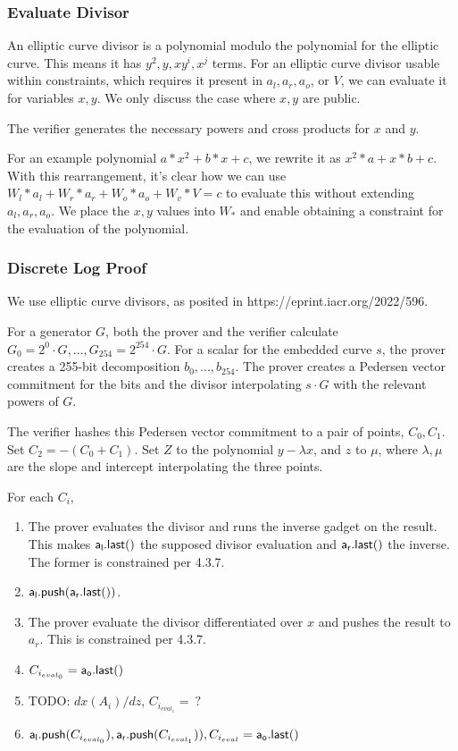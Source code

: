 \documentclass[]{article}
\begin{document}
\subsubsection{Evaluate Divisor}

An elliptic curve divisor is a polynomial modulo the polynomial for the elliptic curve. This means it has $y^2, y, xy^i, x^j$ terms. For an elliptic curve divisor usable within constraints, which requires it present in $a_l, a_r, a_o$, or $V$, we can evaluate it for variables $x, y$. We only discuss the case where $x, y$ are public.

The verifier generates the necessary powers and cross products for $x$ and $y$.

For an example polynomial $a * x^2 + b * x + c$, we rewrite it as $x^2 * a + x * b + c$. With this rearrangement, it's clear how we can use $W_l * a_l + W_r * a_r + W_o * a_o + W_v * V = c$ to evaluate this without extending $a_l, a_r, a_o$. We place the $x, y$ values into $W_*$ and enable obtaining a constraint for the evaluation of the polynomial.

\subsubsection{Discrete Log Proof}

We use elliptic curve divisors, as posited in https://eprint.iacr.org/2022/596.

For a generator $G$, both the prover and the verifier calculate $G_0 = 2^0 \cdot G, ...,G_{254} = 2^{254} \cdot G$. For a scalar for the embedded curve $s$, the prover creates a 255-bit decomposition $b_0, ..., b_{254}$. The prover creates a Pedersen vector commitment for the bits and the divisor interpolating $s \cdot G$ with the relevant powers of $G$.

The verifier hashes this Pedersen vector commitment to a pair of points, $C_0, C_1$. Set $C_2 = -(C_0 + C_1)$. Set $Z$ to the polynomial $y - \lambda x$, and $z$ to $\mu$, where $\lambda, \mu$ are the slope and intercept interpolating the three points.

For each $C_i$,

\begin{enumerate}
	\item The prover evaluates the divisor and runs the inverse gadget on the result. This makes $\mathsf{a_l.last()}$ the supposed divisor evaluation and $\mathsf{a_r.last()}$ the inverse. The former is constrained per 4.3.7.
	\item $\mathsf{a_l.push}(\mathsf{a_r.last()})$.
	\item The prover evaluate the divisor differentiated over $x$ and pushes the result to $a_r$. This is constrained per 4.3.7.
	\item $C_{i_{eval_0}} = \mathsf{a_o.last()}$
	\item TODO: $dx(A_i) / dz$, $C_{i_{eval_1}} = ~?$
	\item $\mathsf{a_l.push}(C_{i_{eval_0}}), \mathsf{a_r.push}(C_{i_{eval_1}})), C_{i_{eval}} = \mathsf{a_o.last()}$
\end{enumerate}
\end{document}
